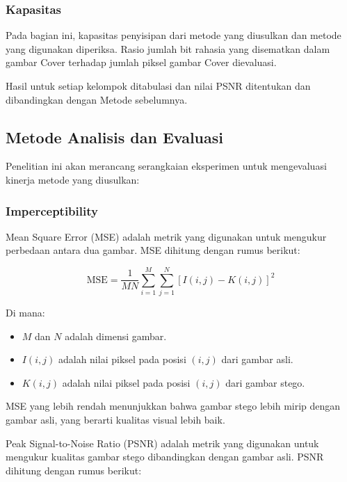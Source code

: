 \documentclass{ittelkom}
\begin{document}
\subsubsection{Kapasitas}

Pada bagian ini, kapasitas penyisipan dari metode yang diusulkan dan metode
yang digunakan diperiksa. Rasio jumlah bit rahasia yang disematkan dalam gambar
Cover terhadap jumlah piksel gambar Cover dievaluasi.

Hasil untuk setiap kelompok ditabulasi dan nilai PSNR ditentukan dan
dibandingkan dengan Metode sebelumnya.

\subsection{Metode Analisis dan Evaluasi}

Penelitian ini akan merancang serangkaian eksperimen untuk mengevaluasi kinerja
metode yang diusulkan:

\subsubsection{Imperceptibility}


Mean Square Error (MSE) adalah metrik yang digunakan untuk mengukur perbedaan
antara dua gambar. MSE dihitung dengan rumus berikut:

\begin{equation}
    \text{MSE} = \frac{1}{MN} \sum_{i=1}^{M} \sum_{j=1}^{N} [I(i,j) - K(i,j)]^2
\end{equation}

Di mana:
\begin{itemize}
    \item $M$ dan $N$ adalah dimensi gambar.
    \item $I(i,j)$ adalah nilai piksel pada posisi $(i,j)$ dari gambar asli.
    \item $K(i,j)$ adalah nilai piksel pada posisi $(i,j)$ dari gambar stego.
\end{itemize}

MSE yang lebih rendah menunjukkan bahwa gambar stego lebih mirip dengan gambar
asli, yang berarti kualitas visual lebih baik.

Peak Signal-to-Noise Ratio (PSNR) adalah metrik yang digunakan untuk mengukur
kualitas gambar stego dibandingkan dengan gambar asli. PSNR dihitung dengan
rumus berikut:
\end{document}
